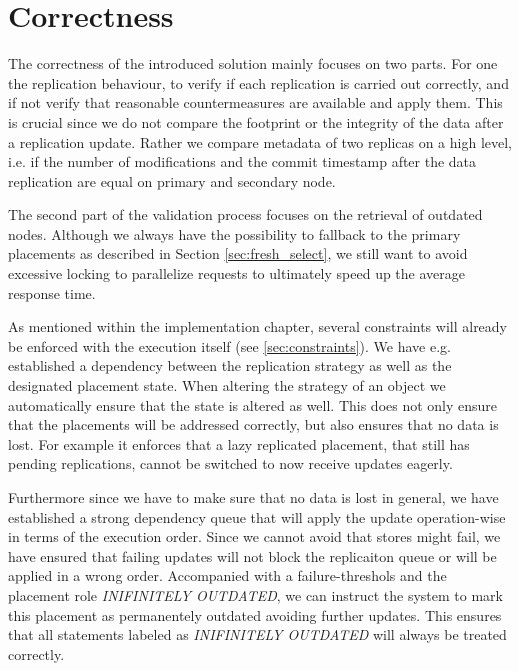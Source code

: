 
\section{Correctness}
\label{sec:correctness}


The correctness of the introduced solution mainly focuses on two parts. For one the replication behaviour, to verify if each replication is carried out correctly,
and if not verify that reasonable countermeasures are available and apply them. This is crucial since we do not compare the footprint or the integrity of the data after 
a replication update. Rather we compare metadata of two replicas on a high level,
i.e. if the number of modifications and the commit timestamp after the data replication are equal on primary and secondary node. 

The second part of the validation process focuses on the retrieval of outdated nodes. Although we always have the possibility to fallback to the primary placements as described in 
Section \ref{sec:fresh_select}, we still want to avoid excessive locking to parallelize requests to ultimately speed up the average response time.

As mentioned within the implementation chapter, several constraints will already be enforced with the execution itself (see \ref{sec:constraints}). 
We have e.g. established a dependency between the replication strategy as well as the designated placement state. When altering the strategy of an object we
automatically ensure that the state is altered as well. This does not only ensure that the placements will be addressed correctly, but also ensures that no data is lost.
For example it enforces that a lazy replicated placement, that still has pending replications, cannot be switched to now receive updates eagerly.

Furthermore since we have to make sure that no data is lost in general, we have established a strong dependency queue that will apply the update operation-wise in terms of the execution order.
Since we cannot avoid that stores might fail, we have ensured that failing updates will not block the replicaiton queue or will be applied in a wrong order.
Accompanied with a failure-threshols and the placement role \emph{INIFINITELY OUTDATED}, we can instruct the system to mark this placement as permanentely outdated 
avoiding further updates. 
This ensures that all statements labeled as \emph{INIFINITELY OUTDATED} will always be treated correctly.

